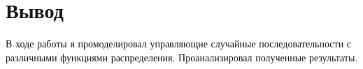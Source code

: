 \chapter{Вывод}
\label{ch:сhap5}

В ходе работы я промоделировал управляющие случайные последовательности с различными функциями распределения. Проанализировал
полученные результаты.


\endinput